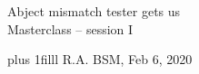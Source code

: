 \documentclass[onepage, 12pt]{beamer}
\author{RA}
\def\Bottom#1{\vskip 0pt plus 1filll #1}
\begin{document}


\begin{frame}[plain,t]
	\begin{center}
        \vspace{1cm}
		Abject mismatch tester gets us
		\\
		{\small\color{gray} Masterclass -- session I}

		\vspace{1cm}


	\end{center}

	\Bottom{
		\scriptsize
		R.A.
		\hfill
		BSM, Feb 6, 2020
		\\ {\ }
	}
\end{frame}


\end{document}
